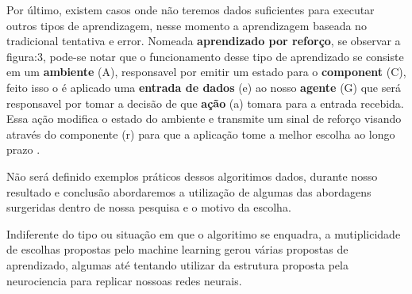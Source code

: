 Por último, existem casos onde não teremos dados suficientes para executar outros tipos de aprendizagem, nesse momento a aprendizagem baseada no tradicional tentativa e error. Nomeada \textbf{aprendizado por reforço}, se observar a figura:3, pode-se notar que o funcionamento desse tipo de aprendizado se consiste em um \textbf{ambiente} (A), responsavel por emitir um estado para o \textbf{component} (C), feito isso o é aplicado uma \textbf{entrada de dados} (e) ao nosso \textbf{agente} (G) que será responsavel por tomar a decisão de que \textbf{ação} (a) tomara para a entrada recebida. Essa ação modifica o estado do ambiente e transmite um sinal de reforço visando através do componente (r) para que a aplicação tome a melhor escolha ao longo prazo \cite{kaelbling1996reinforcement, russell2003artificial}.


Não será definido exemplos práticos dessos algoritimos dados, durante nosso resultado e conclusão abordaremos a utilização de algumas das abordagens surgeridas dentro de nossa pesquisa e o motivo da escolha.

Indiferente do tipo ou situação em que o algoritimo se enquadra, a mutiplicidade de escolhas propostas pelo machine learning gerou várias propostas de aprendizado, algumas até tentando utilizar da estrutura proposta pela neurociencia para replicar nossoas redes neurais.




